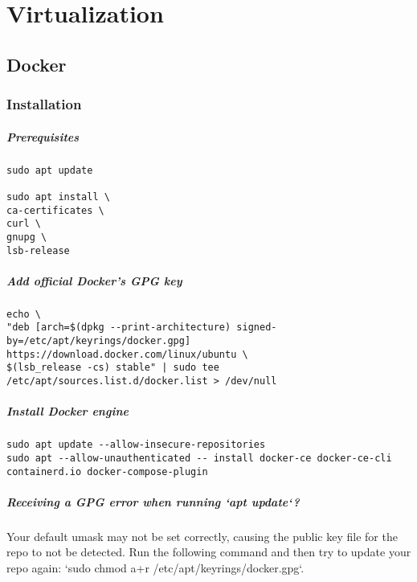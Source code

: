 \chapter{Virtualization}


\section{Docker}

\subsection{Installation}

\paragraph{Prerequisites}

\begin{verbatim}
sudo apt update

sudo apt install \
ca-certificates \
curl \
gnupg \
lsb-release
\end{verbatim}

\paragraph{Add official Docker's GPG key}

\begin{verbatim}
echo \
"deb [arch=$(dpkg --print-architecture) signed-by=/etc/apt/keyrings/docker.gpg] https://download.docker.com/linux/ubuntu \
$(lsb_release -cs) stable" | sudo tee /etc/apt/sources.list.d/docker.list > /dev/null
\end{verbatim}

\paragraph{Install Docker engine}

\begin{verbatim}
sudo apt update --allow-insecure-repositories
sudo apt --allow-unauthenticated -- install docker-ce docker-ce-cli containerd.io docker-compose-plugin
\end{verbatim}

\paragraph{Receiving a GPG error when running `apt update`?}

Your default umask may not be set correctly, causing the public key file for the repo to not be detected. Run the following command and then try to update your repo again: `sudo chmod a+r /etc/apt/keyrings/docker.gpg`.

